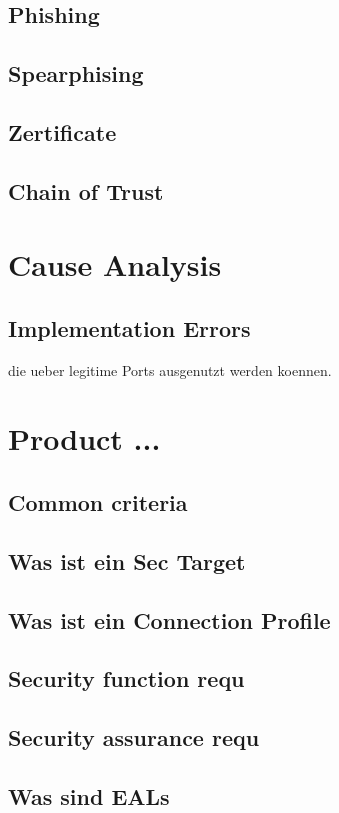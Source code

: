 \documentclass[a4paper, 12pt]{article}
\begin{document}
\subsection{Phishing}
\subsection{Spearphising}
\subsection{Zertificate}
\subsection{Chain of Trust}

\section{Cause Analysis}
\subsection{Implementation Errors}
die ueber legitime Ports ausgenutzt werden koennen.

\section{Product ...}
\subsection{Common criteria}
\subsection{Was ist ein Sec Target}
\subsection{Was ist ein Connection Profile}
\subsection{Security function requ}
\subsection{Security assurance requ}
\subsection{Was sind EALs}
\end{document}
